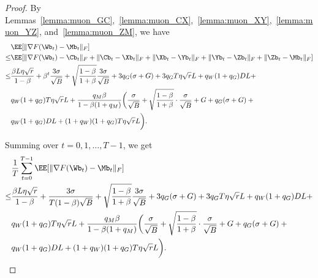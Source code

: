 \documentclass[11pt, letterpaper]{article}
\begin{document}
\begin{proof}
By Lemmas~\ref{lemma:muon_GC},~\ref{lemma:muon_CX},~\ref{lemma:muon_XY},~\ref{lemma:muon_YZ}, and~\ref{lemma:muon_ZM}, we have
\begin{align*}
    &\EE[\|\nabla F(\Wb_t) - \Mb_t\|_F] \\
    \le& \EE[ \|\nabla F(\Wb_t) - \Cb_t\|_F  + \|\Cb_t - \Xb_t\|_F + \|\Xb_t - \Yb_t\|_F + \|\Yb_t - \Zb_t\|_F + \|\Zb_t - \Mb_t\|_F ] \\
    \le& \frac{\beta L\eta\sqrt{r}}{1-\beta} + \beta^t\frac{3\sigma}{\sqrt{B}}+\sqrt{\frac{1-\beta}{1+\beta}}\frac{3\sigma}{\sqrt{B}} + 3q_G(\sigma + G) + 3q_G T\eta\sqrt{r}L + q_W(1+q_G)DL + \\ 
    & q_W(1+q_G)T\eta\sqrt{r}L + \frac{q_M\beta}{1-\beta(1+q_M)}\bigg( \frac{\sigma}{\sqrt{B}} + \sqrt{\frac{1-\beta}{1+\beta}}\cdot\frac{\sigma}{\sqrt{B}} + G + q_G(\sigma + G) + \notag \bigg.\\
    &\bigg. q_W (1+q_G)DL + (1+q_W)(1+q_G)T\eta\sqrt{r}L \bigg).
\end{align*}



Summing over $t=0,1,\ldots,T-1$, we get
\begin{align}\label{eq:muon_sum_GM}
    &\frac{1}{T}\sum_{t=0}^{T-1}\EE[\|\nabla F(\Wb_t) - \Mb_t\|_F] \notag \\
    \le& \frac{\beta L\eta\sqrt{r}}{1-\beta} + \frac{3\sigma}{T(1-\beta)\sqrt{B}} + \sqrt{\frac{1-\beta}{1+\beta}}\frac{3\sigma}{\sqrt{B}} + 3q_G(\sigma + G) + 3q_G T\eta\sqrt{r}L + q_W(1+q_G)DL + \notag \\
    & q_W(1+q_G)T\eta\sqrt{r}L +  \frac{q_M\beta}{1-\beta(1+q_M)}\bigg( \frac{\sigma}{\sqrt{B}} + \sqrt{\frac{1-\beta}{1+\beta}}\cdot\frac{\sigma}{\sqrt{B}} + G + q_G(\sigma + G) + \notag \bigg. \notag \\
    &\bigg. q_W (1+q_G)DL + (1+q_W)(1+q_G)T\eta\sqrt{r}L \bigg).
\end{align}


\end{proof}
\end{document}
